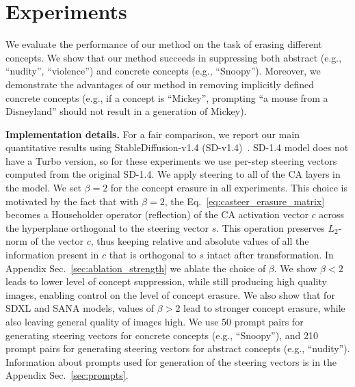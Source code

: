 \section{Experiments}
\label{sec:experiments}


We evaluate the performance of our method on the task of erasing different concepts. 
%
We show that our method succeeds in suppressing both 
abstract (e.g., ``nudity'', ``violence'') and
concrete concepts (e.g., ``Snoopy''). 
%
Moreover, we demonstrate the advantages of our method in removing implicitly defined concrete concepts (e.g., if a concept is ``Mickey'', prompting ``a mouse from a Disneyland'' should not result in a generation of Mickey).


\textbf{Implementation details. }
For a fair comparison, we report our main quantitative results using StableDiffusion-v1.4 (SD-v1.4)~\cite{DBLP:conf/cvpr/RombachBLEO22}. 
%
SD-1.4 model does not have a Turbo version, so for these experiments we use per-step steering vectors computed from the original SD-1.4. We apply steering to all of the CA layers in the model.
%
We set $\beta=2$ for the concept erasure in all experiments. This choice is motivated by the fact that with $\beta=2$, the Eq.~\ref{eq:casteer_erasure_matrix} becomes a Householder operator (reflection) of the CA activation vector $c$
across the hyperplane orthogonal to the steering vector $s$. This operation preserves $L_2$-norm of the vector $c$, thus keeping relative and absolute values of all the information  present in $c$ that is orthogonal to $s$ intact after transformation. In Appendix Sec.~\ref{sec:ablation_strength} we ablate the choice of $\beta$. We show $\beta < 2$ leads to lower level of concept suppression, while still producing high quality images, enabling control on the level of concept erasure. We also show that for SDXL and SANA models, values of $\beta > 2$ lead to stronger concept erasure, while also leaving general quality of images high.
We use 50 prompt pairs for generating steering vectors for concrete concepts (e.g., ``Snoopy''), and 210 prompt pairs for generating steering vectors for abstract concepts (e.g., ``nudity''). Information about prompts used for generation of the steering vectors is in the Appendix Sec.~\ref{sec:prompts}. 

